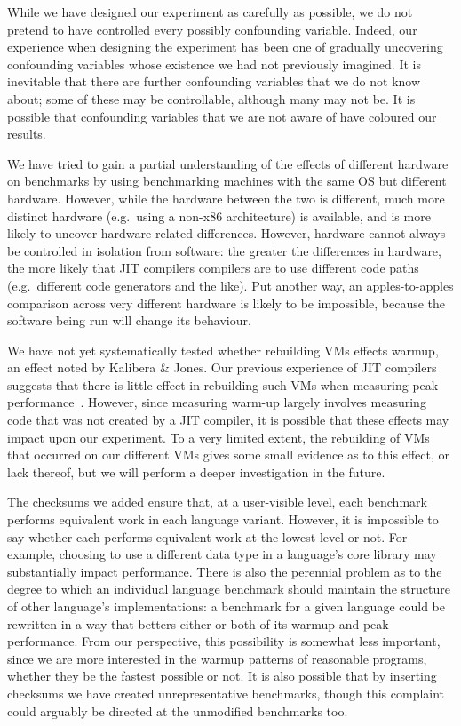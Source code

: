 \documentclass[preprint,numbers,10pt]{sigplanconf}
\newcommand{\kalibera}{Kalibera \& Jones\xspace}
\begin{document}
While we have designed our experiment as carefully as possible, we do not
pretend to have controlled every possibly confounding variable. Indeed, our
experience when designing the experiment has been one of gradually uncovering
confounding variables whose existence we had not previously imagined. It
is inevitable that there are further confounding variables that we
do not know about; some of these may be controllable, although many may not be.
It is possible that confounding variables that we are not aware of have
coloured our results.

We have tried to gain a partial understanding of the effects of different
hardware on benchmarks by using benchmarking machines with the same OS but
different hardware. However, while the hardware between the two is
different, much more distinct hardware (e.g.~using a non-x86 architecture) is
available, and is more likely to uncover hardware-related differences.
However, hardware cannot always be controlled in isolation from software:
the greater the differences in hardware, the more likely that JIT compilers
compilers are to use different code paths (e.g.~different code generators and
the like). Put another way, an apples-to-apples comparison across very different
hardware is likely to be impossible, because the software being run will
change its behaviour.

We have not yet systematically tested whether rebuilding VMs effects warmup, an
effect noted by \kalibera. Our previous experience of JIT compilers suggests
that there is little effect in rebuilding such VMs when measuring peak
performance~\cite{barrett15approaches}. However, since measuring warm-up largely
involves measuring code that was not created by a JIT compiler, it is possible
that these effects may impact upon our experiment. To a very limited extent, the
rebuilding of VMs that occurred on our different VMs gives some small evidence
as to this effect, or lack thereof, but we will perform a deeper investigation
in the future.

The checksums we added ensure that, at a user-visible level, each benchmark
performs equivalent work in each language variant. However, it is impossible to
say whether each performs equivalent work at the lowest level or not. For
example, choosing to use a different data type in a language's core library may
substantially impact performance. There is also the perennial problem as to the
degree to which an individual language benchmark should maintain the structure
of other language's implementations: a benchmark for a given language could be
rewritten in a way that betters either or both of its warmup and peak
performance. From our perspective, this possibility is somewhat less important,
since we are more interested in the warmup patterns of reasonable programs,
whether they be the fastest possible or not. It is also possible that by
inserting checksums we have created unrepresentative benchmarks, though
this complaint could arguably be directed at the unmodified benchmarks too.
\end{document}
